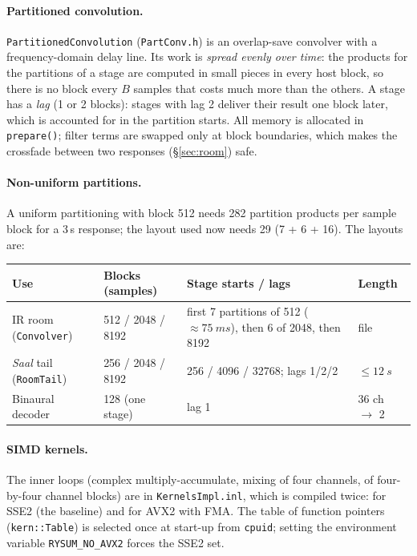 \documentclass[11pt,a4paper,parskip=half,DIV=11,toc=bibliography]{scrartcl}
\newcommand{\ui}[1]{\emph{#1}}                 %
\newcommand{\code}[1]{\texttt{#1}}
\newcommand{\fn}[1]{\mbox{\texttt{#1}}}
\begin{document}
\paragraph{Partitioned convolution.} \fn{PartitionedConvolution} (\fn{PartConv.h}) is an overlap-save
convolver with a frequency-domain delay line. Its work is \emph{spread evenly over time}: the products
for the partitions of a stage are computed in small pieces in every host block, so there is no block
every $B$ samples that costs much more than the others. A stage has a \emph{lag} (1 or 2 blocks):
stages with lag 2 deliver their result one block later, which is accounted for in the partition
starts. All memory is allocated in \code{prepare()}; filter terms are swapped only at block boundaries,
which makes the crossfade between two responses (\S\ref{sec:room}) safe.

\paragraph{Non-uniform partitions.} A uniform partitioning with block 512 needs 282 partition products
per sample block for a 3\,s response; the layout used now needs 29 (7 + 6 + 16). The layouts are:
\begin{center}\small
\begin{tabularx}{\linewidth}{@{}llXl@{}}
\toprule
Use & Blocks (samples) & Stage starts / lags & Length \\
\midrule
IR room (\fn{Convolver})   & 512 / 2048 / 8192 & first 7 partitions of 512 ($\approx\SI{75}{ms}$), then 6 of 2048, then 8192 & file \\
\ui{Saal} tail (\fn{RoomTail}) & 256 / 2048 / 8192 & 256 / 4096 / 32768; lags 1/2/2 & $\le\SI{12}{s}$ \\
Binaural decoder           & 128 (one stage) & lag 1 & 36 ch $\to$ 2 \\
\bottomrule
\end{tabularx}
\end{center}

\paragraph{SIMD kernels.} The inner loops (complex multiply-accumulate, mixing of four channels, of
four-by-four channel blocks) are in \fn{KernelsImpl.inl}, which is compiled twice: for SSE2 (the
baseline) and for AVX2 with FMA. The table of function pointers (\fn{kern::Table}) is selected once at
start-up from \code{cpuid}; setting the environment variable \code{RYSUM\_NO\_AVX2} forces the SSE2 set.
\end{document}
